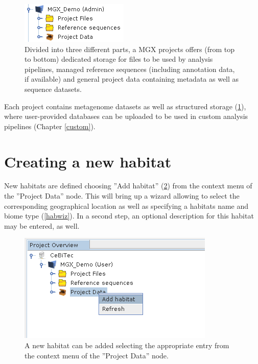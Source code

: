 \begin{figure}[H]
\centering
\includegraphics[width=.4\textwidth]{img/mgx/projstructure}
\caption[Project structure]{Divided into three different parts, a MGX projects offers
(from top to bottom) dedicated storage for files to be used by analysis pipelines, 
managed reference sequences (including annotation data, if available) and general
project data containing metadata as well as sequence datasets.}
\label{structure}
\end{figure}

Each project contains metagenome datasets as well as structured storage (\ref{structure}), where user-provided
databases can be uploaded to be used in custom analysis pipelines (Chapter \ref{custom}).

\section{Creating a new habitat}

New habitats are defined choosing ''Add habitat'' (\ref{addhabitat}) from the context menu of the ''Project Data''
node. This will bring up a wizard allowing to select the corresponding geographical location as well as
specifying a habitats name and biome type (\ref{habwiz}). In a second step, an optional description for this
habitat may be entered, as well.

\begin{figure}[H]
\centering
\includegraphics[width=.4\textwidth]{img/mgx/addhabitat}
\caption[Habitat creation]{A new habitat can be added selecting the appropriate entry from the context
menu of the ''Project Data'' node.}
\label{addhabitat}
\end{figure}

